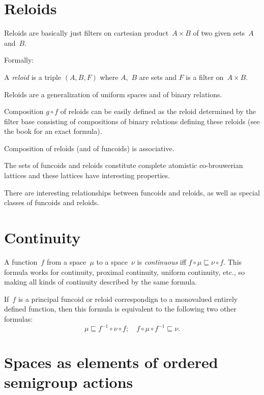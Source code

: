 \documentclass{amsart}
\begin{document}
\section{Reloids}

Reloids are basically just filters on cartesian product~$A\times B$ of two given sets~$A$ and~$B$.

Formally:

\begin{defn}
A \emph{reloid} is a triple $(A,B,F)$ where $A$,~$B$ are sets and $F$ is a filter on~$A\times B$.
\end{defn}

Reloids are a generalization of uniform spaces and of binary relations.

\begin{defn}
Composition $g\circ f$ of reloids can be easily defined as the reloid determined by the filter base
consisting of compositions of binary relations defining these reloids (see the book for an exact formula).
\end{defn}

\begin{prop}
Composition of reloids (and of funcoids) is associative.
\end{prop}

The sets of funcoids and reloids constitute complete atomistic co-brouwerian lattices and these lattices have interesting
properties.

There are interesting relationships between funcoids and reloids, as well as special classes of funcoids and reloids.

\section{Continuity}

A function~$f$ from a space~$\mu$ to a space~$\nu$ is \emph{continuous} iff
$f\circ\mu\sqsubseteq \nu\circ f$. This formula works for continuity, proximal continuity,
uniform continuity, etc., so making all kinds of continuity described by the same formula.

If~$f$ is a principal funcoid or reloid correspondign to a monovalued entirely defined function, then this formula is
equivalent to the following two other formulas:
\[ \mu\sqsubseteq f^{-1}\circ\nu\circ f;\quad
f\circ\mu\circ f^{-1}\sqsubseteq \nu. \]

\section{Spaces as elements of ordered semigroup actions}
\end{document}
